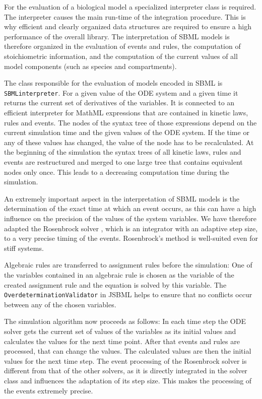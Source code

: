 \documentclass{bioinfo}
\newcommand{\OverdeterminationValidator}{\texttt{Overdetermination\-Validator}}
\newcommand{\SBMLinterpreter}{\texttt{SBML\-interpreter}}
\begin{document}
\begin{methods}
For the evaluation of a biological model a specialized interpreter class is
required. The interpreter causes the main run-time of the integration procedure.
This is why efficient and clearly organized data structures are required to
ensure a high performance of the overall library. The interpretation of SBML
models is therefore organized in the evaluation of events and rules, the
computation of stoichiometric information, and the computation of the current
values of all model components (such as species and compartments).

The class responsible for the evaluation of models encoded in SBML is
\SBMLinterpreter.
For a given value of the ODE system and a given time it returns the current set of
derivatives of the variables. It is connected to an efficient
interpreter for MathML expressions that are contained in kinetic laws, rules
and events. The nodes of the syntax tree of those expressions depend on the
current simulation time and the given values of the ODE system. If the time or
any of these values has changed, the value of the node has to be recalculated.
At the beginning of the simulation the syntax trees of all kinetic laws, rules
and events are restructured and merged to one large tree that contains
equivalent nodes only once. This leads to a decreasing computation time during
the simulation.

An extremely important aspect in the interpretation of SBML models is the
determination of the exact time at which an event occurs, as this can have a
high influence on the precision of the values of the system variables. We have
therefore adapted the Rosenbrock solver \citep{Kotcon2011}, which is an
integrator with an adaptive step size, to a very precise timing of the events.
Rosenbrock's method is well-suited even for stiff systems.

Algebraic rules are transferred to assignment rules before the simulation: One
of the variables contained in an algebraic rule is chosen as the variable of the
created assignment rule and the equation is solved by this variable. The
\OverdeterminationValidator{} in JSBML helps to ensure that no conflicts occur
between any of the chosen variables.

The simulation algorithm now proceeds as follows: In each time step the ODE
solver gets the current set of values of the variables as its initial values and
calculates the values for the next time point. After that events
and rules are processed, that can change the values. The calculated values are
then the initial values for the next time step. The event processing of the
Rosenbrock solver is different from that of the other solvers, as it
is directly integrated in the solver class and influences the adaptation of its
step size. This makes the processing of the events extremely precise.
\end{methods}
\end{document}

